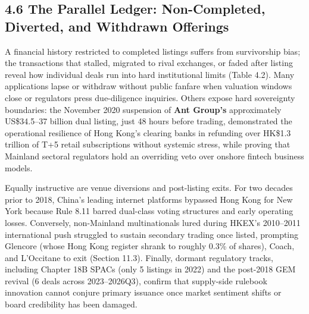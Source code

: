 \documentclass[11pt,letterpaper]{article}
\begin{document}
\subsection*{\texorpdfstring{4.6 The Parallel Ledger: Non-Completed, Diverted, and Withdrawn Offerings}{4.6 The Parallel Ledger: Non-Completed, Diverted, and Withdrawn Offerings}}
A financial history restricted to completed listings suffers from survivorship bias; the transactions that stalled, migrated to rival exchanges, or faded after listing reveal how individual deals run into hard institutional limits (Table 4.2). Many applications lapse or withdraw without public fanfare when valuation windows close or regulators press due-diligence inquiries. Others expose hard sovereignty boundaries: the November 2020 suspension of \textbf{Ant Group's} approximately US\$34.5–37 billion dual listing, just 48 hours before trading, demonstrated the operational resilience of Hong Kong's clearing banks in refunding over HK\$1.3 trillion of T+5 retail subscriptions without systemic stress, while proving that Mainland sectoral regulators hold an overriding veto over onshore fintech business models.

Equally instructive are venue diversions and post-listing exits. For two decades prior to 2018, China's leading internet platforms bypassed Hong Kong for New York because Rule 8.11 barred dual-class voting structures and early operating losses. Conversely, non-Mainland multinationals lured during HKEX's 2010–2011 international push struggled to sustain secondary trading once listed, prompting Glencore (whose Hong Kong register shrank to roughly 0.3\% of shares), Coach, and L'Occitane to exit (Section 11.3). Finally, dormant regulatory tracks, including Chapter 18B SPACs (only 5 listings in 2022) and the post-2018 GEM revival (6 deals across 2023–2026Q3), confirm that supply-side rulebook innovation cannot conjure primary issuance once market sentiment shifts or board credibility has been damaged.
\end{document}
